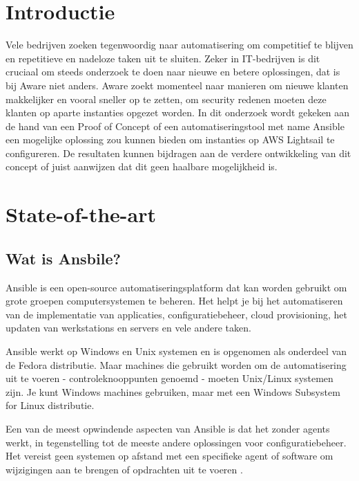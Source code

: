 
\section{Introductie}%
\label{sec:introductie}

Vele bedrijven zoeken tegenwoordig naar automatisering om competitief te blijven en repetitieve en nadeloze taken uit te sluiten. 
Zeker in IT-bedrijven is dit cruciaal om steeds onderzoek te doen naar nieuwe en betere oplossingen, dat is bij Aware niet anders. 
Aware zoekt momenteel naar manieren om nieuwe klanten makkelijker en vooral sneller op te zetten, om security redenen 
moeten deze klanten op aparte instanties opgezet worden. In dit onderzoek wordt gekeken 
aan de hand van een Proof of Concept of een automatiseringstool met name Ansible een mogelijke oplossing zou kunnen bieden 
om instanties op AWS Lightsail te configureren. De resultaten kunnen bijdragen aan de 
verdere ontwikkeling van dit concept of juist aanwijzen dat dit geen haalbare mogelijkheid is.


\section{State-of-the-art}%
\label{sec:state-of-the-art}

\subsection{Wat is Ansbile?}
\label{subsec:Wat is Ansible?}
Ansible is een open-source automatiseringsplatform dat kan worden gebruikt om grote groepen computersystemen te beheren. 
Het helpt je bij het automatiseren van de implementatie van applicaties, configuratiebeheer, cloud provisioning, 
het updaten van werkstations en servers en vele andere taken. 
\par 
Ansible werkt op Windows en Unix systemen en is opgenomen 
als onderdeel van de Fedora distributie. Maar machines die gebruikt worden om de automatisering uit te voeren - 
controleknooppunten genoemd - moeten Unix/Linux systemen zijn. Je kunt Windows machines gebruiken, 
maar met een Windows Subsystem for Linux distributie. 
\par
Een van de meest opwindende aspecten van Ansible is dat het zonder 
agents werkt, in tegenstelling tot de meeste andere oplossingen voor configuratiebeheer. 
Het vereist geen systemen op afstand met een specifieke agent of software om wijzigingen 
aan te brengen of opdrachten uit te voeren
\autocite{Manjaly2022}.

